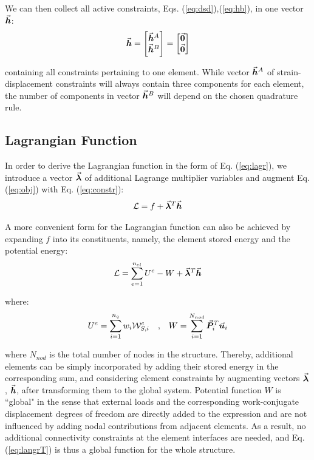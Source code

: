 \noindent We can then collect all active constraints, Eqs.
(\ref{eq:dsd}),(\ref{eq:hb}), in one vector $\vec{\bm{h}}$:
\begin{equation}
	\vec{\bm{h}} = \begin{bmatrix}
		\vec{\bm{h}}^A \\
		\vec{\bm{h}}^B
	\end{bmatrix} = \begin{bmatrix}
		\vec{\bm{0}}\\
		\vec{\bm{0}}
	\end{bmatrix}
	\label{eq:constr}
\end{equation}

\noindent containing all constraints pertaining to one element.
While vector $\vec{\bm{h}}^A$ of strain-displacement constraints
will always contain three components for each element, the number of components 
in vector
$\vec{\bm{h}}^B$ will depend on the chosen quadrature rule.

\subsection{Lagrangian Function}\label{subsection:CH2-S3SS4}

In order to derive the Lagrangian function in the form of Eq. (\ref{eq:lagr}),
we introduce a vector $\vec{\bm{\lambda}}$ of additional Lagrange multiplier
variables and augment Eq. (\ref{eq:obj}) with Eq. (\ref{eq:constr}):  %
\begin{gather}
	\mathcal{L} = f + \vec{\bm{\lambda}}^T\vec{\bm{h}}
	\label{eq:elangr}
\end{gather}

\noindent A more convenient form for the Lagrangian function can also be
achieved by expanding $f$ into its constituents, namely, the element stored
energy and the potential energy:
\begin{gather}
	\mathcal{L} = \sum_{e=1}^{n_{el}}U^e - W +
	\vec{\bm{\lambda}}^T\vec{\bm{h}}
	\label{eq:langrT}
\end{gather}

\noindent where:
\begin{gather}
	U^e = \sum_{i=1}^{n_q} w_i\mathcal{W}_{S,i}^e \quad 
	\text{,}\quad W = 
	\sum_{i=1}^{N_{nod}}
	\vec{\bm{P}}_i^T\vec{\bm{u}}_i\nonumber
\end{gather}

\noindent where $N_{nod}$ is the total number of nodes in the 
structure. Thereby, additional elements can be simply incorporated 
by adding
their stored energy in the corresponding sum, and considering element
constraints by augmenting vectors $\vec{\bm{\lambda}}$, $\vec{\bm{h}}$, after 
transforming
them to the global system. Potential function $W$ is ``global" in the
sense that external loads and the corresponding work-conjugate displacement
degrees of freedom are directly added to the expression and are not
influenced by adding nodal contributions from adjacent elements. As a result,
no additional connectivity constraints at the element interfaces are needed,
and Eq. (\ref{eq:langrT}) is thus a global function for the
whole structure.


